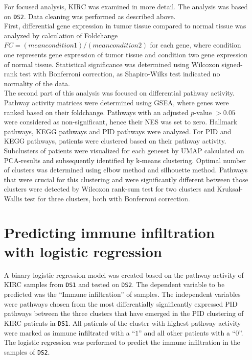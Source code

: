 \documentclass[
  parskip,
  oneside]{scrreprt}
\begin{document}
For focused analysis, KIRC was examined in more detail. The analysis was
based on \texttt{DS2}. Data cleaning was performed as described above.\\
First, differential gene expression in tumor tissue compared to normal
tissue was analyzed by calculation of Foldchange
\(FC =(mean condition 1) / (mean condition 2)\) for each gene, where
condition one represents gene expression of tumor tissue and condition
two gene expression of normal tissue. Statistical significance was
determined using Wilcoxon signed-rank test with Bonferroni correction,
as Shapiro-Wilks test indicated no normality of the data.\\
The second part of this analysis was focused on differential pathway
activity. Pathway activity matrices were determined using GSEA, where
genes were ranked based on their foldchange. Pathways with an adjusted
\(p\)-value \(>0.05\) were considered as non-significant, hence their
NES was set to zero. Hallmark pathways, KEGG pathways and PID pathways
were analyzed. For PID and KEGG pathways, patients were clustered based
on their pathway activity. Subclusters of patients were visualized for
each geneset by UMAP calculated on PCA-results and subsequently
identified by k-means clustering. Optimal number of clusters was
determined using elbow method and silhouette method. Pathways that were
crucial for this clustering and were significantly different between
those clusters were detected by Wilcoxon rank-sum test for two clusters
and Kruksal-Wallis test for three clusters, both with Bonferroni
correction.

\hypertarget{predicting-immune-infiltration-with-logistic-regression}{%
\section{Predicting immune infiltration with logistic
regression}\label{predicting-immune-infiltration-with-logistic-regression}}

A binary logistic regression model was created based on the pathway
activity of KIRC samples from \texttt{DS1} and tested on \texttt{DS2}.
The dependent variable to be predicted was the ``Immune infiltration''
of samples. The independent variables were pathways chosen from the most
differentially significantly expressed PID pathways between the three
clusters that have emerged in the PID clustering of KIRC patients in
\texttt{DS1}. All patients of the cluster with highest pathway activity
were marked as immune infiltrated with a ``\(1\)'' and all other
patients with a ``\(0\)''. The logistic regression was performed to
predict the immune infiltration in the samples of \texttt{DS2}.
\end{document}
